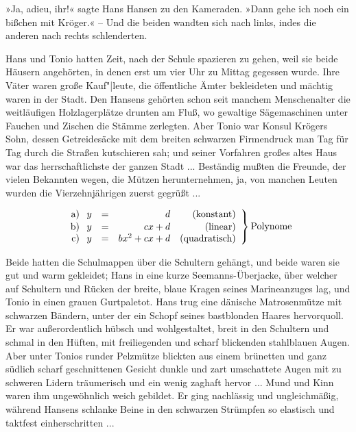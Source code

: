 \documentclass[a5paper,ngerman,11pt]{article}
\begin{document}
»Ja, adieu, ihr!« sagte Hans Hansen zu den Kameraden. »Dann gehe ich
noch ein bißchen mit Kröger.« -- Und die beiden wandten sich nach links,
indes die anderen nach rechts schlenderten.

Hans und Tonio hatten Zeit, nach der Schule spazieren zu gehen, weil sie
beide Häusern angehörten, in denen erst um vier Uhr zu Mittag gegessen
wurde. Ihre Väter waren große Kauf"|leute, die öffentliche Ämter
bekleideten und mächtig waren in der Stadt. Den Hansens gehörten schon
seit manchem Menschenalter die weitläufigen Holzlagerplätze drunten am
Fluß, wo gewaltige Sägemaschinen unter Fauchen und Zischen die Stämme
zerlegten. Aber Tonio war Konsul Krögers Sohn, dessen Getreidesäcke mit
dem breiten schwarzen Firmendruck man Tag für Tag durch die Straßen
kutschieren sah; und seiner Vorfahren großes altes Haus war das
herrschaftlichste der ganzen Stadt ... Beständig mußten die Freunde, der
vielen Bekannten wegen, die Mützen herunternehmen, ja, von manchen
Leuten wurden die Vierzehnjährigen zuerst gegrüßt ...

\setlength\arraycolsep{1.4pt}
\begin{equation}
    \left.
    \begin{array}{r@{\hspace{.75em}}ccrr}
        \textrm{a}) & y & = & d                     & \textrm{(konstant)}   \\[1pt]
        \textrm{b}) & y & = & cx+d                     & \textrm{(linear)}   \\
        \textrm{c}) & y & = & bx^2+cx+d                     & \textrm{(quadratisch)}   \\
    \end{array}
    \right\} \textrm{Polynome}
\end{equation}

Beide hatten die Schulmappen über die Schultern gehängt, und beide waren
sie gut und warm gekleidet; Hans in eine kurze Seemanns-Überjacke, über
welcher auf Schultern und Rücken der breite, blaue Kragen seines
Marineanzuges lag, und Tonio in einen grauen Gurtpaletot. Hans trug eine
dänische Matrosenmütze mit schwarzen Bändern, unter der ein Schopf
seines bastblonden Haares hervorquoll. Er war außerordentlich hübsch und
wohlgestaltet, breit in den Schultern und schmal in den Hüften, mit
freiliegenden und scharf blickenden stahlblauen Augen. Aber unter Tonios
runder Pelzmütze blickten aus einem brünetten und ganz südlich scharf
geschnittenen Gesicht dunkle und zart umschattete Augen mit zu schweren
Lidern träumerisch und ein wenig zaghaft hervor ... Mund und Kinn waren
ihm ungewöhnlich weich gebildet. Er ging nachlässig und ungleichmäßig,
während Hansens schlanke Beine in den schwarzen Strümpfen so elastisch
und taktfest einherschritten ...
\end{document}
